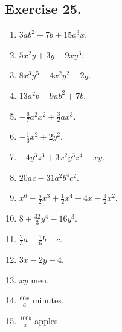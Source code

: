 \documentclass{book}
\begin{document}
\subsection*{Exercise 25.}
\begin{enumerate}

\item $3ab^2 - 7b + 15a^3 x$.

\item $5x^2 y + 3y - 9xy^3$.

\item $8x^3 y^5 - 4x^2 y^2 - 2y$.

\item $13a^2 b - 9ab^2 + 7b$.

\item $-\frac{6}{7} a^2x^2 + \frac{3}{2} ax^3$.

\item $-\frac{1}{3} x^2 + 2y^2$.

\item $-4y^3 z^3 + 3x^2 y^3 z^4 - xy$.

\item $20ac - 31a^2 b^4 c^2$.

\item $x^6 - \frac{5}{2} x^3 + \frac{1}{2} x^4 - 4x - \frac {3}{2}
x^2$.

\item $8 + \frac{32}{3} y^4 - 16y^3$.

\item $\frac{2}{3} a - \frac{1}{6} b - c$.

\item $3x - 2y - 4$.

\item $xy$ men.

\item $\frac{60x}{a}$ minutes.

\item $\frac{100b}{x}$ apples.
\end{enumerate}
\end{document}
